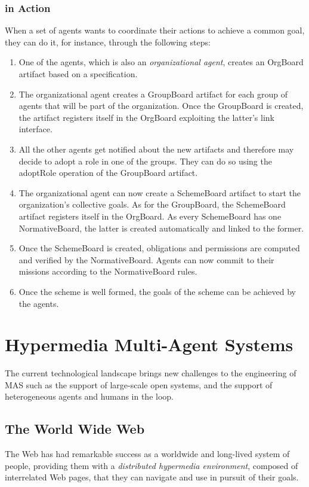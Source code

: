 \subsubsection{\oraformas{} in Action}
When a set of agents wants to coordinate their actions to achieve a common goal, they can do it, for instance, through the following steps:
\begin{enumerate}
    \item One of the agents, which is also an \textit{organizational agent}, creates an \textsf{OrgBoard} artifact based on a specification.
    \item The organizational agent creates a \textsf{GroupBoard} artifact for each group of agents that will be part of the organization.
    Once the \textsf{GroupBoard} is created,  the artifact registers itself in the \textsf{OrgBoard} exploiting the latter's link interface.
    \item All the other agents get notified about the new artifacts and therefore may decide to adopt a role in one of the groups.
    They can do so using the \textsf{adoptRole} operation of the \textsf{GroupBoard} artifact.
    \item The organizational agent can now create a \textsf{SchemeBoard} artifact to start the organization's collective goals.
    As for the \textsf{GroupBoard}, the \textsf{SchemeBoard} artifact registers itself in the \textsf{OrgBoard}.
    As every \textsf{SchemeBoard} has one \textsf{NormativeBoard}, the latter is created automatically and linked to the former.
    \item Once the \textsf{SchemeBoard} is created, obligations and permissions are computed and verified by the \textsf{NormativeBoard}.
    Agents can now commit to their missions according to the \textsf{NormativeBoard} rules.
    \item Once the scheme is well formed, the goals of the scheme can be achieved by the agents.
\end{enumerate}

\section{Hypermedia Multi-Agent Systems}
The current technological landscape brings new challenges to the engineering of MAS such as the support of large-scale open systems, and the support of heterogeneous agents and humans in the loop.

\subsection{The World Wide Web}
The Web has had remarkable success as a worldwide and long-lived system of people, providing them with a \textit{distributed hypermedia environment}, composed of interrelated Web pages, that they can navigate and use in pursuit of their goals.

